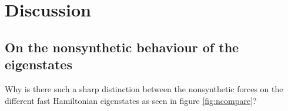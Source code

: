 \documentclass[main.tex]{subfiles}
\begin{document}
\section{Discussion}
\subsection{On the nonsynthetic behaviour of the eigenstates}
Why is there such a sharp distinction between the nonsynthetic forces on the different fast
Hamiltonian eigenstates as seen in figure \ref{fig:ncompare}?
\end{document}
